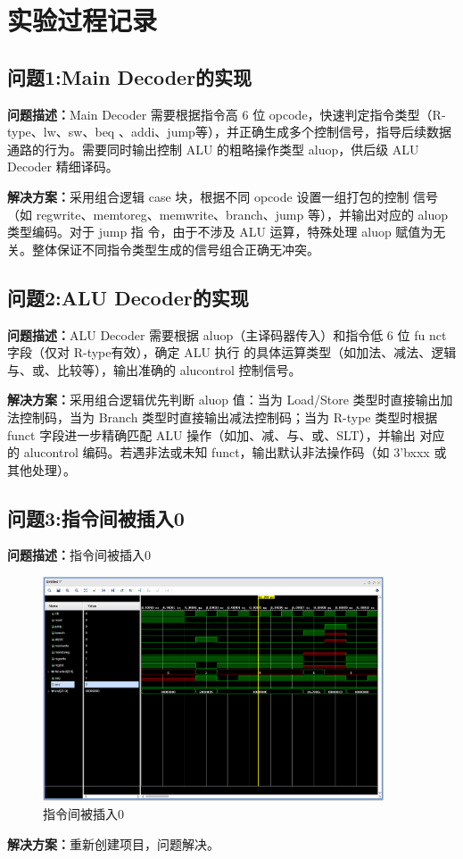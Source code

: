 \section{实验过程记录}
\subsection{问题1:Main Decoder的实现}
\textbf{问题描述：}Main Decoder 需要根据指令高 6 位 opcode，快速判定指令类型（R-type、lw、sw、beq
、addi、jump等），并正确生成多个控制信号，指导后续数据通路的行为。需要同时输出控制 ALU 的粗略操作类型 aluop，供后级 ALU Decoder 精细译码。

\textbf{解决方案：}采用组合逻辑 case 块，根据不同 opcode 设置一组打包的控制
信号（如 regwrite、memtoreg、memwrite、branch、jump 等），并输出对应的 aluop 类型编码。对于 jump 指
令，由于不涉及 ALU 运算，特殊处理 aluop 赋值为无关。整体保证不同指令类型生成的信号组合正确无冲突。
 \subsection{问题2:ALU Decoder的实现}
\textbf{问题描述：}ALU Decoder 需要根据 aluop（主译码器传入）和指令低 6 位 fu
nct 字段（仅对 R-type有效），确定 ALU 执行
的具体运算类型（如加法、减法、逻辑与、或、比较等），输出准确的 alucontrol 控制信号。

\textbf{解决方案：}采用组合逻辑优先判断 aluop 值：当为 Load/Store 
类型时直接输出加法控制码，当为 Branch 类型时直接输出减法控制码；当为 
R-type 类型时根据 funct 字段进一步精确匹配 ALU 操作（如加、减、与、或、SLT），并输出
对应的 alucontrol 编码。若遇非法或未知 funct，输出默认非法操作码（如 3'bxxx 或其他处理）。
\subsection{问题3:指令间被插入0}
\textbf{问题描述：}指令间被插入0
\begin{figure}[H]
    \centering
    \includegraphics[width=0.9\textwidth]{image/pr.png}
    \caption{指令间被插入0}
    \label{fig:my_label}
\end{figure}
\textbf{解决方案：}重新创建项目，问题解决。